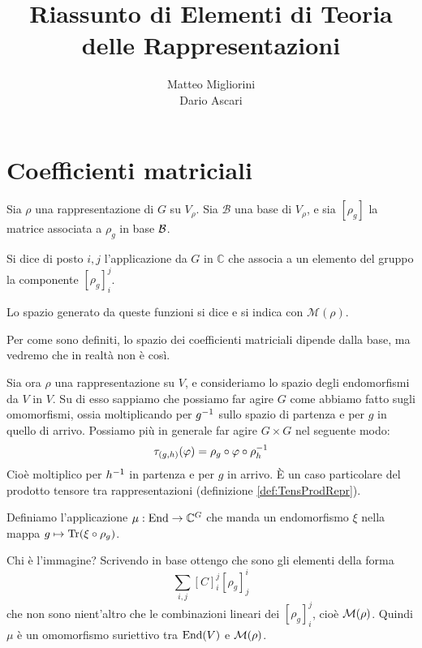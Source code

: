 \documentclass[a4paper,10pt,oneside]{math_article}
\title{Riassunto di Elementi di Teoria delle Rappresentazioni}
\author{Matteo Migliorini \\ Dario Ascari}
\date{}
\renewcommand{\phi}{\varphi}
\newcommand{\func}[2][\bC]{#1^{#2}}
\begin{document}
 
 
 \maketitle
 
 \cleardoublepage	
 
 \cleardoublepage
 \tableofcontents
 \cleardoublepage
 
 
 
 
 
 
 

  \section{Coefficienti matriciali}
    \begin{mydef}
     Sia $\rho$ una rappresentazione di $G$ su $V_\rho$. Sia $\mathcal B$ una base di $V_\rho$, e sia $[\rho_g]$ la matrice associata a $\rho_g$ in base $\mathcal B$.
     
     Si dice  di posto $i,j$ l'applicazione da $G$ in $\mathbb C$ che associa a un elemento del gruppo la componente $[\rho_g]_i^j$.
     
     Lo spazio generato da queste funzioni si dice  e si indica con $\mathcal M(\rho)$.
    \end{mydef}
    
    Per come sono definiti, lo spazio dei coefficienti matriciali dipende dalla base, ma vedremo che in realtà non è così.
    
    Sia ora $\rho$ una rappresentazione su $V$, e consideriamo lo spazio degli endomorfismi da $V$ in $V$. Su di esso sappiamo che possiamo far agire $G$ come abbiamo fatto sugli omomorfismi, ossia moltiplicando per $g^{-1}$ sullo spazio di partenza e per $g$ in quello di arrivo. Possiamo più in generale far agire $G\times G$ nel seguente modo:
    \[
     \tau_{(g,h)} (\phi) = \rho_g \circ \phi \circ \rho_h\inv
    \]
		Cioè moltiplico per $h^{-1}$ in partenza e per $g$ in arrivo. \`E un caso particolare del prodotto tensore tra rappresentazioni (definizione \ref{def:TensProdRepr}).
		
		Definiamo l'applicazione $\mu: \End \rar \func G$ che manda un endomorfismo $\xi$ nella mappa $g\mapsto \operatorname{Tr}(\xi\circ\rho_g)$.

		Chi è l'immagine? Scrivendo in base ottengo che sono gli elementi della forma
		\[
			\sum_{i,j} [C]_i^j[\rho_g]_j^i
		\]
		che non sono nient'altro che le combinazioni lineari dei $[\rho_g]_i^j$, cioè $\mathcal M(\rho)$. Quindi $\mu$ è un omomorfismo suriettivo tra $\operatorname{End}(V)$ e $\mathcal M(\rho)$.
		
\end{document}
